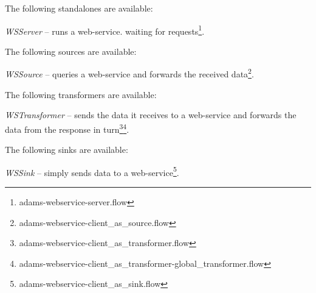\documentclass[a4paper]{book}
\begin{document}
The following standalones are available:
\begin{tight_itemize}
	\item \textit{WSServer} -- runs a web-service. waiting for 
	requests\footnote{adams-webservice-server.flow}.
\end{tight_itemize}
The following sources are available:
\begin{tight_itemize}
	\item \textit{WSSource} -- queries a web-service and forwards the received 
	data\footnote{adams-webservice-client\_as\_source.flow}.
\end{tight_itemize}
The following transformers are available:
\begin{tight_itemize}
	\item \textit{WSTransformer} -- sends the data it receives to a web-service
	and forwards the data from the response in 
	turn\footnote{adams-webservice-client\_as\_transformer.flow}\footnote{adams-webservice-client\_as\_transformer-global\_transformer.flow}.
\end{tight_itemize}
The following sinks are available:
\begin{tight_itemize}
	\item \textit{WSSink} -- simply sends data to a web-service\footnote{adams-webservice-client\_as\_sink.flow}.
\end{tight_itemize}


\end{document}
